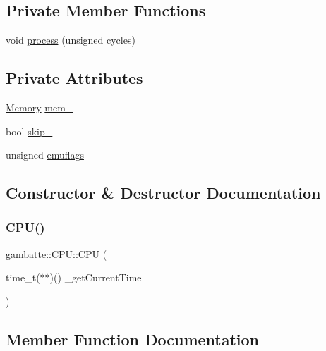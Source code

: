 \subsection*{Private Member Functions}
\begin{DoxyCompactItemize}
\item 
void \hyperlink{classgambatte_1_1CPU_a63b5d72cc327137ab5f044f37e9f34d8}{process} (unsigned cycles)
\end{DoxyCompactItemize}
\subsection*{Private Attributes}
\begin{DoxyCompactItemize}
\item 
\hyperlink{classgambatte_1_1Memory}{Memory} \hyperlink{classgambatte_1_1CPU_aa862b7f29fdadacb7e9c7f5bad5378dd}{mem\+\_\+}
\item 
bool \hyperlink{classgambatte_1_1CPU_ab23de2b8a001515be3cea35c8b2b7ae9}{skip\+\_\+}
\item 
unsigned \hyperlink{classgambatte_1_1CPU_a18ef95586d1819ebf05245c119afa48b}{emuflags}
\end{DoxyCompactItemize}


\subsection{Constructor \& Destructor Documentation}
\mbox{\label{classgambatte_1_1CPU_ad2f22383ec6a786778ceb7f834871714}} 
\subsubsection{\texorpdfstring{C\+P\+U()}{CPU()}}
{\footnotesize\ttfamily gambatte\+::\+C\+P\+U\+::\+C\+PU (\begin{DoxyParamCaption}\item[{time\+\_\+t($\ast$$\ast$)()}]{\+\_\+get\+Current\+Time }\end{DoxyParamCaption})}



\subsection{Member Function Documentation}
\mbox{\label{classgambatte_1_1CPU_aa89004927dd05645edf880507c440442}} 
